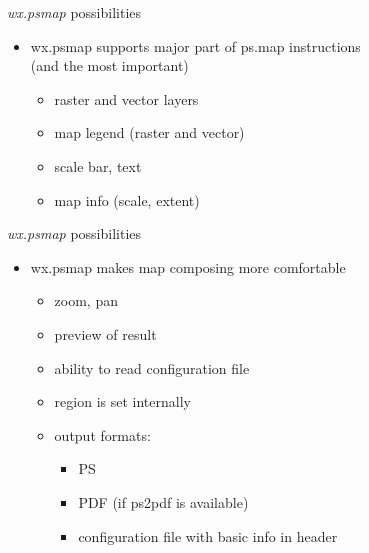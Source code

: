 \documentclass[xcolor=dvipsnames,beamer,compress]{beamer} %
\newcommand{\roztazeneradky}{%
\renewcommand{\baselinestretch}{1.3}%
\selectfont
}
\begin{document}
\begin{frame}{\emph{wx.psmap} possibilities}
\roztazeneradky
\begin{itemize}
\item wx.psmap  supports major part of ps.map instructions\\
(and the most important)
\begin{itemize}
\item raster and vector layers
\item map legend (raster and vector)
\item scale bar, text
\item map info (scale, extent)
\end{itemize}
\end{itemize}
\end{frame}


\begin{frame}{\emph{wx.psmap} possibilities}
\roztazeneradky
\begin{itemize}
\item wx.psmap makes map composing more comfortable
\begin{itemize}
\item zoom, pan
\item preview of result
\item ability to read configuration file
\item region is set internally
\item output formats:
    \begin{itemize}
      \item PS
      \item PDF (if ps2pdf is available)
      \item configuration file with basic info in header
    \end{itemize}

\end{itemize}
\end{itemize}
\end{frame}
\end{document}
